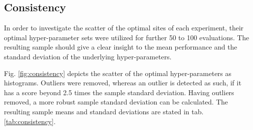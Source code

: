 \subsection{Consistency}
In order to investigate the scatter of the optimal sites of each experiment, their optimal hyper-parameter sets were utilized for further 50 to 100 evaluations.
The resulting sample should give a clear insight to the mean performance and the standard deviation of the underlying hyper-parameters.

Fig. \ref{fig:consistency} depicts the scatter of the optimal hyper-parameters as histograms.
Outliers were removed, whereas an outlier is detected as such, if it has a score beyond 2.5 times the sample standard deviation.
Having outliers removed, a more robust sample standard deviation can be calculated.
The resulting sample means and standard deviations are stated in tab. \ref{tab:consistency}.


